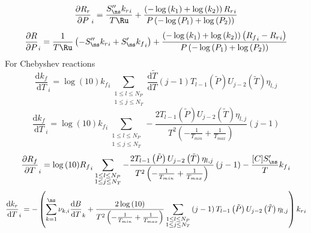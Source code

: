 \documentclass[a4paper,10pt]{article}
\begin{document}
\begin{dmath} \frac{\partial {R_r} }{\partial P }_{i} = \frac{S^{\prime\prime}_{\ns} {k_r}_{i}}{T \Ru} + \frac{\left(- \log{\left (k_{1} \right )} + \log{\left (k_{2} \right )}\right) {R_r}_{i}}{P \left(- \log{\left (P_{1} \right )} + \log{\left (P_{2} \right )}\right)}\end{dmath} 
\begin{dmath} \frac{\partial R }{\partial P }_{i} = \frac{1}{T \Ru} \left(- S^{\prime\prime}_{\ns} {k_r}_{i} + S^{\prime}_{\ns} {k_f}_{i}\right) + \frac{\left(- \log{\left (k_{1} \right )} + \log{\left (k_{2} \right )}\right) \left({R_f}_{i} - {R_r}_{i}\right)}{P \left(- \log{\left (P_{1} \right )} + \log{\left (P_{2} \right )}\right)}\end{dmath} 
For Chebyshev reactions
\begin{dmath} \frac{\text{d} {k_f} }{\text{d} T }_{i} = \log{\left (10 \right )} {k_f}_{i} \sum_{\substack{1 \leq l \leq N_{P}\\1 \leq j \leq N_{T}}} \frac{\text{d} \tilde{T} }{\text{d} T } \left(j - 1\right) T_{l - 1}\left(\tilde{P}\right) U_{j - 2}\left(\tilde{T}\right) \eta_{l,j}\end{dmath} 
\begin{dmath} \frac{\text{d} {k_f} }{\text{d} T }_{i} = \log{\left (10 \right )} {k_f}_{i} \sum_{\substack{1 \leq l \leq N_{P}\\1 \leq j \leq N_{T}}} - \frac{2 T_{l - 1}\left(\tilde{P}\right) U_{j - 2}\left(\tilde{T}\right) \eta_{l,j}}{T^{2} \left(- \frac{1}{T_{min}} + \frac{1}{T_{max}}\right)} \left(j - 1\right)\end{dmath} 
\begin{dmath} \frac{\partial {R_f} }{\partial T }_{i} = \log{\left (10 \right )} {R_f}_{i} \sum_{\substack{1 \leq l \leq N_{P}\\1 \leq j \leq N_{T}}} - \frac{2 T_{l - 1}\left(\tilde{P}\right) U_{j - 2}\left(\tilde{T}\right) \eta_{l,j}}{T^{2} \left(- \frac{1}{T_{min}} + \frac{1}{T_{max}}\right)} \left(j - 1\right) - \frac{[C] S^{\prime}_{\ns}}{T} {k_f}_{i}\end{dmath} 
\begin{dmath} \frac{\text{d} {k_r} }{\text{d} T }_{i} = - \left(\sum_{k=1}^{\ns} \nu_{k,i} \frac{\text{d} B }{\text{d} T }_{k} + \frac{2 \log{\left (10 \right )}}{T^{2} \left(- \frac{1}{T_{min}} + \frac{1}{T_{max}}\right)} \sum_{\substack{1 \leq l \leq N_{P}\\1 \leq j \leq N_{T}}} \left(j - 1\right) T_{l - 1}\left(\tilde{P}\right) U_{j - 2}\left(\tilde{T}\right) \eta_{l,j}\right) {k_r}_{i}\end{dmath} 
\end{document}
